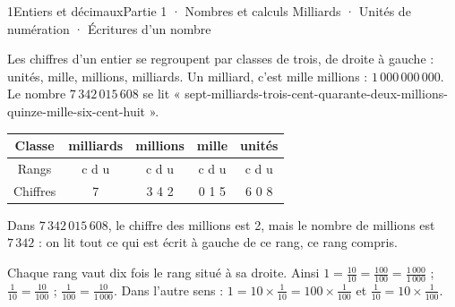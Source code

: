\begin{ouverture}[calcul]{1}{Entiers et décimaux}{Partie 1 · Nombres et calculs}
{Milliards · Unités de numération · Écritures d’un nombre}
\end{ouverture}
\pagestyle{otMain}\essentiel\fontsize{11}{15}\selectfont
{}\label{cours-1-1}
\begin{definition}Les chiffres d’un entier se regroupent par classes de trois, de droite à gauche : unités, mille, millions, milliards. Un milliard, c’est mille millions : $1\,000\,000\,000$. Le nombre $7\,342\,015\,608$ se lit « sept-milliards-trois-cent-quarante-deux-millions-quinze-mille-six-cent-huit ».\end{definition}
\begin{center}\renewcommand{\arraystretch}{1.35}\begin{tabular}{c|cccc}\toprule
Classe & milliards & millions & mille & unités\\\midrule
Rangs & c d u & c d u & c d u & c d u\\
Chiffres & 7 & 3 4 2 & 0 1 5 & 6 0 8\\
\bottomrule\end{tabular}\end{center}
\begin{savoirfaire}Dans $7\,342\,015\,608$, le chiffre des millions est 2, mais le nombre de millions est $7\,342$ : on lit tout ce qui est écrit à gauche de ce rang, ce rang compris.\end{savoirfaire}
\begin{propriete}Chaque rang vaut dix fois le rang situé à sa droite. Ainsi $1=\frac{10}{10}=\frac{100}{100}=\frac{1\,000}{1\,000}$ ; $\frac1{10}=\frac{10}{100}$ ; $\frac1{100}=\frac{10}{1\,000}$. Dans l’autre sens : $1=10\times\frac1{10}=100\times\frac1{100}$ et $\frac1{10}=10\times\frac1{100}$.\end{propriete}
\label{fig-cours-1-1-cours-centiemes}

